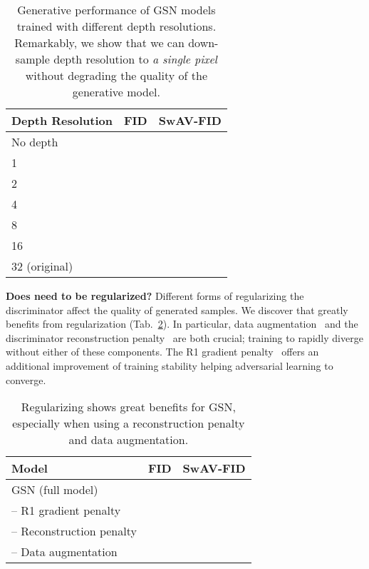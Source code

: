 \documentclass[10pt,twocolumn,letterpaper]{article}
\begin{document}
\begin{table}[h]
\small
\begin{center}
 \begin{tabular}{lcc}
 \toprule
 Depth Resolution & FID  & SwAV-FID  \\
 \midrule
 No depth &  &  \\
 1 &  &  \\
 2 &  &  \\
 4 &  &  \\
 8 &  &  \\
 16 &  & \\
 32 (original) &  &  \\
 \bottomrule
\end{tabular}
\end{center}
\caption{Generative performance of GSN models trained with different depth resolutions. Remarkably, we show that we can down-sample depth resolution to \textit{a single pixel} without degrading the quality of the generative model.}
\label{tab:depth_resolution}
\end{table}

\textbf{Does  need to be regularized?} Different forms of regularizing the discriminator affect the quality of generated samples. We discover that  greatly benefits from regularization (Tab.~\ref{tab:regularizer_ablation}). In particular, data augmentation~\cite{diffaugment} and the discriminator reconstruction penalty~\cite{self_supervised_discriminator} are both crucial; training to rapidly diverge without either of these components. The R1 gradient penalty~\cite{r1} offers an additional improvement of training stability helping adversarial learning to converge.

\begin{table}[h]
\small
\begin{center}
 \begin{tabular}{lcc}
 \toprule
 Model & FID  & SwAV-FID  \\
 \midrule
 GSN (full model) &  &  \\
  \quad -- R1 gradient penalty &  & \\
 \quad -- Reconstruction penalty &  & \\
 \quad -- Data augmentation &  &  \\
 \bottomrule

\end{tabular}
\end{center}
\caption{Regularizing  shows great benefits for GSN, especially when using a reconstruction penalty and data augmentation.}
\label{tab:regularizer_ablation}
\end{table}
\end{document}
